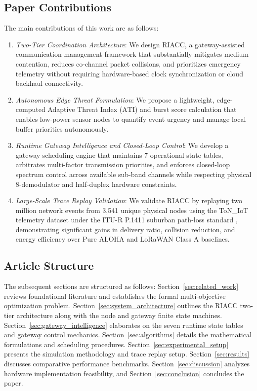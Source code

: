\documentclass[preprint,review,12pt]{elsarticle}
\begin{document}
\subsection{Paper Contributions}
The main contributions of this work are as follows:
\begin{enumerate}
    \item \textit{Two-Tier Coordination Architecture}: We design RIACC, a gateway-assisted communication management framework that substantially mitigates medium contention, reduces co-channel packet collisions, and prioritizes emergency telemetry without requiring hardware-based clock synchronization or cloud backhaul connectivity.
    \item \textit{Autonomous Edge Threat Formulation}: We propose a lightweight, edge-computed Adaptive Threat Index ($\text{ATI}$) and burst score calculation that enables low-power sensor nodes to quantify event urgency and manage local buffer priorities autonomously.
    \item \textit{Runtime Gateway Intelligence and Closed-Loop Control}: We develop a gateway scheduling engine that maintains 7 operational state tables, arbitrates multi-factor transmission priorities, and enforces closed-loop spectrum control across available sub-band channels while respecting physical 8-demodulator and half-duplex hardware constraints.
    \item \textit{Large-Scale Trace Replay Validation}: We validate RIACC by replaying two million network events from 3,541 unique physical nodes using the ToN\_IoT telemetry dataset \cite{alhawawreh2020toniot} under the ITU-R P.1411 suburban path-loss standard \cite{itur2019p1411}, demonstrating significant gains in delivery ratio, collision reduction, and energy efficiency over Pure ALOHA and LoRaWAN Class A baselines.
\end{enumerate}

\subsection{Article Structure}
The subsequent sections are structured as follows: Section~\ref{sec:related_work} reviews foundational literature and establishes the formal multi-objective optimization problem. Section~\ref{sec:system_architecture} outlines the RIACC two-tier architecture along with the node and gateway finite state machines. Section~\ref{sec:gateway_intelligence} elaborates on the seven runtime state tables and gateway control mechanics. Section~\ref{sec:algorithms} details the mathematical formulations and scheduling procedures. Section~\ref{sec:experimental_setup} presents the simulation methodology and trace replay setup. Section~\ref{sec:results} discusses comparative performance benchmarks. Section~\ref{sec:discussion} analyzes hardware implementation feasibility, and Section~\ref{sec:conclusion} concludes the paper.
\end{document}
